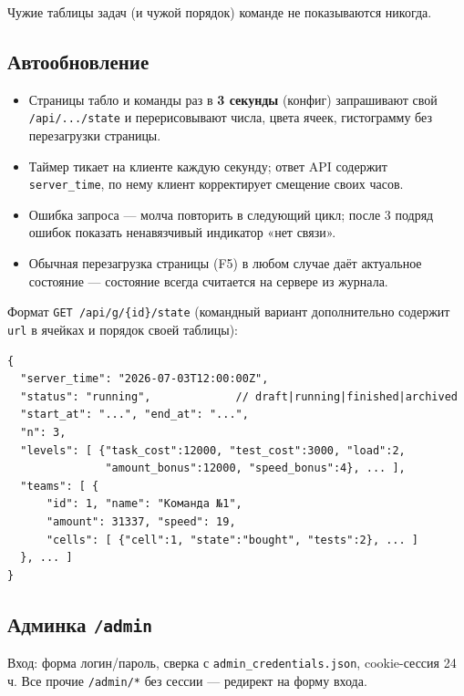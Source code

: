 \documentclass[12pt,a4paper]{article}
\newcommand{\field}[1]{\texttt{#1}}
\begin{document}
Чужие таблицы задач (и чужой порядок) команде не показываются никогда.

\subsection{Автообновление}
\label{sec:refresh}

\begin{itemize}[nosep]
  \item Страницы табло и команды раз в \textbf{3 секунды} (конфиг)
        запрашивают свой \field{/api/.../state} и перерисовывают числа,
        цвета ячеек, гистограмму без перезагрузки страницы.
  \item Таймер тикает на клиенте каждую секунду; ответ API содержит
        \field{server\_time}, по нему клиент корректирует смещение своих
        часов.
  \item Ошибка запроса --- молча повторить в следующий цикл; после
        3 подряд ошибок показать ненавязчивый индикатор «нет связи».
  \item Обычная перезагрузка страницы (F5) в любом случае даёт актуальное
        состояние --- состояние всегда считается на сервере из журнала.
\end{itemize}

Формат \field{GET /api/g/\{id\}/state} (командный вариант дополнительно
содержит \field{url} в ячейках и порядок своей таблицы):

\begin{small}\begin{verbatim}
{
  "server_time": "2026-07-03T12:00:00Z",
  "status": "running",             // draft|running|finished|archived
  "start_at": "...", "end_at": "...",
  "n": 3,
  "levels": [ {"task_cost":12000, "test_cost":3000, "load":2,
               "amount_bonus":12000, "speed_bonus":4}, ... ],
  "teams": [ {
      "id": 1, "name": "Команда №1",
      "amount": 31337, "speed": 19,
      "cells": [ {"cell":1, "state":"bought", "tests":2}, ... ]
  }, ... ]
}
\end{verbatim}\end{small}

\subsection{Админка \field{/admin}}
\label{sec:admin}

Вход: форма логин/пароль, сверка с \field{admin\_credentials.json},
cookie-сессия 24 ч. Все прочие \field{/admin/*} без сессии --- редирект на
форму входа.
\end{document}
